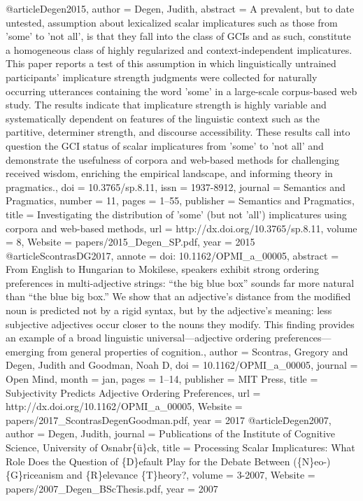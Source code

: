 @article{Degen2015,
author = {Degen, Judith},
abstract = {A prevalent, but to date untested, assumption about lexicalized scalar implicatures such as those from 'some' to 'not all', is that they fall into the class of GCIs and as such, constitute a homogeneous class of highly regularized and context-independent implicatures. This paper reports a test of this assumption in which linguistically untrained participants’ implicature strength judgments were collected for naturally occurring utterances containing the word 'some' in a large-scale corpus-based web study. The results indicate that implicature strength is highly variable and systematically dependent on features of the linguistic context such as the partitive, determiner strength, and discourse accessibility. These results call into question the GCI status of scalar implicatures from 'some' to 'not all' and demonstrate the usefulness of corpora and web-based methods for challenging received wisdom, enriching the empirical landscape, and informing theory in pragmatics.},
doi = {10.3765/sp.8.11},
issn = {1937-8912},
journal = {Semantics and Pragmatics},
number = {11},
pages = {1--55},
publisher = {Semantics and Pragmatics},
title = {{Investigating the distribution of 'some' (but not 'all') implicatures using corpora and web-based methods}},
url = {http://dx.doi.org/10.3765/sp.8.11},
volume = {8},
Website = {papers/2015_Degen_SP.pdf},
year = {2015}
}
@article{ScontrasDG2017,
annote = {doi: 10.1162/OPMI{\_}a{\_}00005},
abstract = {From English to Hungarian to Mokilese, speakers exhibit strong ordering preferences in multi-adjective strings: “the big blue box” sounds far more natural than “the blue big box.” We show that an adjective’s distance from the modified noun is predicted not by a rigid syntax, but by the adjective’s meaning: less subjective adjectives occur closer to the nouns they modify. This finding provides an example of a broad linguistic universal—adjective ordering preferences—emerging from general properties of cognition.},
author = {Scontras, Gregory and Degen, Judith and Goodman, Noah D},
doi = {10.1162/OPMI_a_00005},
journal = {Open Mind},
month = {jan},
pages = {1--14},
publisher = {MIT Press},
title = {{Subjectivity Predicts Adjective Ordering Preferences}},
url = {http://dx.doi.org/10.1162/OPMI{\_}a{\_}00005},
Website = {papers/2017_ScontrasDegenGoodman.pdf},
year = {2017}
}
@article{Degen2007,
author = {Degen, Judith},
journal = {Publications of the Institute of Cognitive Science, University of Osnabr{\{}{\"{u}}{\}}ck},
title = {{Processing Scalar Implicatures: What Role Does the Question of {\{}D{\}}efault Play for the Debate Between ({\{}N{\}}eo-){\{}G{\}}riceanism and {\{}R{\}}elevance {\{}T{\}}heory?}},
volume = {3-2007},
Website = {papers/2007_Degen_BScThesis.pdf},
year = {2007}
}
